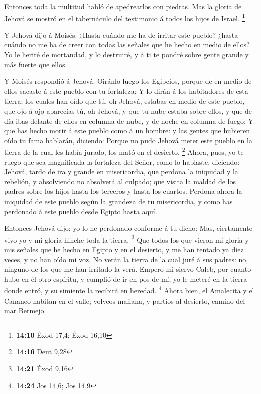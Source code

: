  Entonces toda la multitud habló de apedrearlos con
piedras. Mas la gloria de Jehová se mostró en el tabernáculo del
testimonio á todos los hijos de Israel. \footnote{\textbf{14:10} Éxod
  17,4; Éxod 16,10}

 Y Jehová dijo á Moisés: ¿Hasta cuándo me ha de irritar
este pueblo? ¿hasta cuándo no me ha de creer con todas las señales que
he hecho en medio de ellos?  Yo le heriré de mortandad, y
lo destruiré, y á ti te pondré sobre gente grande y más fuerte que
ellos.

 Y Moisés respondió á Jehová: Oiránlo luego los Egipcios,
porque de en medio de ellos sacaste á este pueblo con tu fortaleza:
 Y lo dirán á los habitadores de esta tierra; los cuales
han oído que tú, oh Jehová, estabas en medio de este pueblo, que ojo á
ojo aparecías tú, oh Jehová, y que tu nube estaba sobre ellos, y que de
día ibas delante de ellos en columna de nube, y de noche en columna de
fuego:  Y que has hecho morir á este pueblo como á un
hombre: y las gentes que hubieren oído tu fama hablarán, diciendo:
 Porque no pudo Jehová meter este pueblo en la tierra de
la cual les había jurado, los mató en el desierto. \footnote{\textbf{14:16}
  Deut 9,28}  Ahora, pues, yo te ruego que sea
magnificada la fortaleza del Señor, como lo hablaste, diciendo:
 Jehová, tardo de ira y grande en misericordia, que
perdona la iniquidad y la rebelión, y absolviendo no absolverá al
culpado; que visita la maldad de los padres sobre los hijos hasta los
terceros y hasta los cuartos.  Perdona ahora la iniquidad
de este pueblo según la grandeza de tu misericordia, y como has
perdonado á este pueblo desde Egipto hasta aquí.

 Entonces Jehová dijo: yo lo he perdonado conforme á tu
dicho:  Mas, ciertamente vivo yo y mi gloria hinche toda
la tierra, \footnote{\textbf{14:21} Éxod 9,16}  Que todos
los que vieron mi gloria y mis señales que he hecho en Egipto y en el
desierto, y me han tentado ya diez veces, y no han oído mi voz,
 No verán la tierra de la cual juré á sus padres: no,
ninguno de los que me han irritado la verá.  Empero mi
siervo Caleb, por cuanto hubo en él otro espíritu, y cumplió de ir en
pos de mí, yo le meteré en la tierra donde entró, y su simiente la
recibirá en heredad. \footnote{\textbf{14:24} Jos 14,6; Jos 14,9}
 Ahora bien, el Amalecita y el Cananeo habitan en el
valle; volveos mañana, y partíos al desierto, camino del mar Bermejo.


